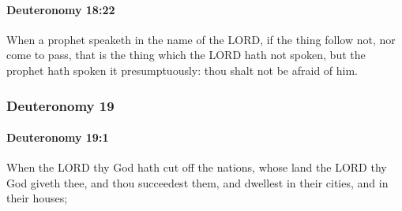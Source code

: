 		\paragraph{Deuteronomy 18:22} %
			\label{DEUTERONOMY-18-22}

			When a prophet speaketh in the name of the LORD, if the thing follow not, nor come to pass, that is the thing which the LORD hath not spoken, but the prophet hath spoken it presumptuously: thou shalt not be afraid of him.

	\subsubsection{Deuteronomy 19} %
		\label{DEUTERONOMY-19}

		\paragraph{Deuteronomy 19:1} %
			\label{DEUTERONOMY-19-1}

			When the LORD thy God hath cut off the nations, whose land the LORD thy God giveth thee, and thou succeedest them, and dwellest in their cities, and in their houses;

